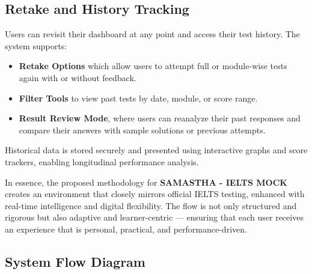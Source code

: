 \documentclass[a4paper,12pt]{article}
\begin{document}
\subsection{Retake and History Tracking}

Users can revisit their dashboard at any point and access their test history. The system supports:
\begin{itemize}
    \item \textbf{Retake Options} which allow users to attempt full or module-wise tests again with or without feedback.
    \item \textbf{Filter Tools} to view past tests by date, module, or score range.
    \item \textbf{Result Review Mode}, where users can reanalyze their past responses and compare their answers with sample solutions or previous attempts.
\end{itemize}

Historical data is stored securely and presented using interactive graphs and score trackers, enabling longitudinal performance analysis.

\vspace{0.5cm}

\noindent
In essence, the proposed methodology for \textbf{SAMASTHA - IELTS MOCK} creates an environment that closely mirrors official IELTS testing, enhanced with real-time intelligence and digital flexibility. The flow is not only structured and rigorous but also adaptive and learner-centric — ensuring that each user receives an experience that is personal, practical, and performance-driven.


\vspace{1cm}
\subsection{System Flow Diagram}
\end{document}
